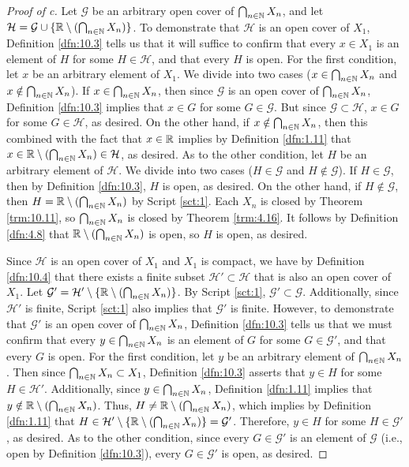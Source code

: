 \documentclass[../main.tex]{subfiles}
\begin{document}
\begin{enumerate}
\begin{proof}[Proof of c]
        Let $\mathcal{G}$ be an arbitrary open cover of $\bigcap_{n\in\mathbb{N}}X_n$, and let $\mathcal{H}=\mathcal{G}\cup\{\mathbb{R}\setminus(\bigcap_{n\in\mathbb{N}}X_n)\}$. To demonstrate that $\mathcal{H}$ is an open cover of $X_1$, Definition \ref{dfn:10.3} tells us that it will suffice to confirm that every $x\in X_1$ is an element of $H$ for some $H\in\mathcal{H}$, and that every $H$ is open. For the first condition, let $x$ be an arbitrary element of $X_1$. We divide into two cases ($x\in\bigcap_{n\in\mathbb{N}}X_n$ and $x\notin\bigcap_{n\in\mathbb{N}}X_n$). If $x\in\bigcap_{n\in\mathbb{N}}X_n$, then since $\mathcal{G}$ is an open cover of $\bigcap_{n\in\mathbb{N}}X_n$, Definition \ref{dfn:10.3} implies that $x\in G$ for some $G\in\mathcal{G}$. But since $\mathcal{G}\subset\mathcal{H}$, $x\in G$ for some $G\in\mathcal{H}$, as desired. On the other hand, if $x\notin\bigcap_{n\in\mathbb{N}}X_n$, then this combined with the fact that $x\in\mathbb{R}$ implies by Definition \ref{dfn:1.11} that $x\in\mathbb{R}\setminus(\bigcap_{n\in\mathbb{N}}X_n)\in\mathcal{H}$, as desired. As to the other condition, let $H$ be an arbitrary element of $\mathcal{H}$. We divide into two cases ($H\in\mathcal{G}$ and $H\notin\mathcal{G}$). If $H\in\mathcal{G}$, then by Definition \ref{dfn:10.3}, $H$ is open, as desired. On the other hand, if $H\notin\mathcal{G}$, then $H=\mathbb{R}\setminus(\bigcap_{n\in\mathbb{N}}X_n)$ by Script \ref{sct:1}. Each $X_n$ is closed by Theorem \ref{trm:10.11}, so $\bigcap_{n\in\mathbb{N}}X_n$ is closed by Theorem \ref{trm:4.16}. It follows by Definition \ref{dfn:4.8} that $\mathbb{R}\setminus(\bigcap_{n\in\mathbb{N}}X_n)$ is open, so $H$ is open, as desired.\par
        Since $\mathcal{H}$ is an open cover of $X_1$ and $X_1$ is compact, we have by Definition \ref{dfn:10.4} that there exists a finite subset $\mathcal{H}'\subset\mathcal{H}$ that is also an open cover of $X_1$. Let $\mathcal{G}'=\mathcal{H}'\setminus\{\mathbb{R}\setminus(\bigcap_{n\in\mathbb{N}}X_n)\}$. By Script \ref{sct:1}, $\mathcal{G}'\subset\mathcal{G}$. Additionally, since $\mathcal{H}'$ is finite, Script \ref{sct:1} also implies that $\mathcal{G}'$ is finite. However, to demonstrate that $\mathcal{G}'$ is an open cover of $\bigcap_{n\in\mathbb{N}}X_n$, Definition \ref{dfn:10.3} tells us that we must confirm that every $y\in\bigcap_{n\in\mathbb{N}}X_n$ is an element of $G$ for some $G\in\mathcal{G}'$, and that every $G$ is open. For the first condition, let $y$ be an arbitrary element of $\bigcap_{n\in\mathbb{N}}X_n$. Then since $\bigcap_{n\in\mathbb{N}}X_n\subset X_1$, Definition \ref{dfn:10.3} asserts that $y\in H$ for some $H\in\mathcal{H}'$. Additionally, since $y\in\bigcap_{n\in\mathbb{N}}X_n$, Definition \ref{dfn:1.11} implies that $y\notin\mathbb{R}\setminus(\bigcap_{n\in\mathbb{N}}X_n)$. Thus, $H\neq\mathbb{R}\setminus(\bigcap_{n\in\mathbb{N}}X_n)$, which implies by Definition \ref{dfn:1.11} that $H\in\mathcal{H}'\setminus\{\mathbb{R}\setminus(\bigcap_{n\in\mathbb{N}}X_n)\}=\mathcal{G}'$. Therefore, $y\in H$ for some $H\in\mathcal{G}'$, as desired. As to the other condition, since every $G\in\mathcal{G}'$ is an element of $\mathcal{G}$ (i.e., open by Definition \ref{dfn:10.3}), every $G\in\mathcal{G}'$ is open, as desired.\par\medskip

\end{proof}
\end{enumerate}
\end{document}
